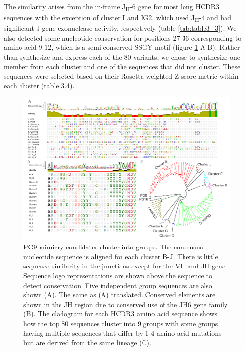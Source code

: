 The similarity arises from the in-frame J\textsubscript{H}-6 gene for most long HCDR3 sequences with the exception of cluster I and IG2, which used J\textsubscript{H}-4 and had significant J-gene exonuclease activity, respectively (table \ref{tab:table3_3}). We also detected some nucleotide conservation for positions 27-36 corresponding to amino acid 9-12, which is a semi-conserved SSGY motif (figure \ref{fig:figure3_12} A-B). Rather than synthesize and express each of the 80 variants, we chose to synthesize one member from each cluster and one of the sequences that did not cluster. These sequences were selected based on their Rosetta weighted Z-score metric within each cluster (table 3.4).

\begin{figure}
   \centering
   \includegraphics[width=.9\linewidth]{images/chapter3/figure3_12.pdf} %
   \caption[PG9-Mimicry Candidates Cluster Into Groups]{PG9-mimicry candidates cluster into groups. The consensus nucleotide sequence is aligned for each cluster B-J. There is little sequence similarity in the junctions except for the VH and JH gene. Sequence logo representations are shown above the sequence to detect conservation. Five independent group sequences are also shown (A). The same as (A) translated. Conserved elements are shown in the JH region due to conserved use of the JH6 gene family (B). The cladogram for each HCDR3 amino acid sequence shows how the top 80 sequences cluster into 9 groups with some groups having multiple sequences that differ by 1-4 amino acid mutations but are derived from the same lineage (C).}
   \label{fig:figure3_12}
\end{figure}



